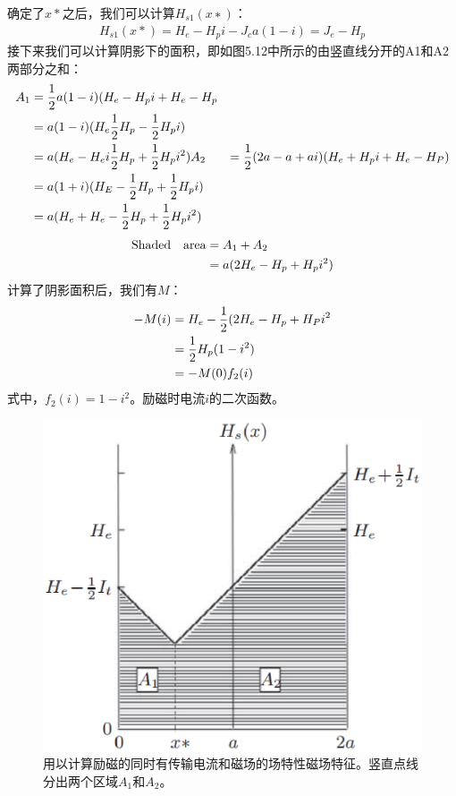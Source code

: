 确定了$x*$之后，我们可以计算$H_{s1}(x∗)$：
\begin{align*}%
H_{s1}(x*)=H_{e}-H_{p}i-J_{c}a(1-i)=J_{e}-H_{p}
\end{align*}
接下来我们可以计算阴影下的面积，即如图5.12中所示的由竖直线分开的A1和A2两部分之和：
\begin{align*}%
A_{1}&=\frac{1}{2}a(1-i)(H_{e}-H_{p}i+H_{e}-H_{p}\\
&=a(1-i)(H_{e}\frac{1}{2}H_{p}-\frac{1}{2}H_{p}i)\\
&=a(H_{e}-H_{e}i\frac{1}{2}H_{p}+\frac{1}{2}H_{p}i^{2})
A_{2}&=\frac{1}{2}(2a-a+ai)(H_{e}+H_{p}i+H_{e}-H_{P})\\\notag
&=a(1+i)(H_E-\frac{1}{2}H_{p}+\frac{1}{2}H_{p}i)\\\notag
&=a(H_{e}+H_{e}-\frac{1}{2}H_{p}+\frac{1}{2}H_{p}i^{2})
\end{align*}
\begin{align*}%
\text{Shaded\quad area}&=A_{1}+A_{2}\\
&=a(2H_{e}-H_{p}+H_{p}i^{2})
\end{align*}
计算了阴影面积后，我们有$M$：
\begin{subequations}
	\begin{align*}
-M(i)&=H_{e}-\frac{1}{2}(2H_{e}-H_{p}+H_{P}i^{2}\\\notag
&=\frac{1}{2}H_{p}(1-i^{2})\\
&=-M(0)f_{2}(i)
	\end{align*}
\end{subequations}
式中，$f_2(i) = 1 − i^2$。励磁时电流$i$的二次函数。

\begin{figure}[htbp]
	\centering
	\includegraphics[scale=0.6]{chpt5/figs/fig5.12.eps}
	\caption{用以计算励磁的同时有传输电流和磁场的场特性磁场特征。竖直点线分出两个区域$A_1$和$A_2$。}
\end{figure}


